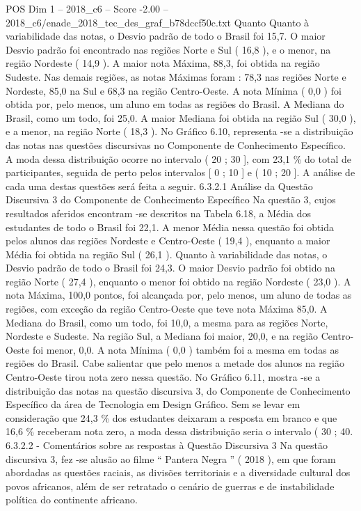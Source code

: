 \begin{textsample}{POS Dim 1 – 2018\_c6 – Score -2.00 – 2018\_c6/enade\_2018\_tec\_des\_graf\_b78dccf50c.txt}
Quanto Quanto à variabilidade das notas, o Desvio padrão de todo o Brasil foi 15,7.
O maior Desvio padrão foi encontrado nas regiões Norte e Sul ( 16,8 ), e o menor, na região Nordeste ( 14,9 ).
A maior nota Máxima, 88,3, foi obtida na região Sudeste.
Nas demais regiões, as notas Máximas foram : 78,3 nas regiões Norte e Nordeste, 85,0 na Sul e 68,3 na região Centro-Oeste.
A nota Mínima ( 0,0 ) foi obtida por, pelo menos, um aluno em todas as regiões do Brasil.
A Mediana do Brasil, como um todo, foi 25,0.
A maior Mediana foi obtida na região Sul ( 30,0 ), e a menor, na região Norte ( 18,3 ).
No Gráfico 6.10, representa -se a distribuição das notas nas questões discursivas no Componente de Conhecimento Específico.
A moda dessa distribuição ocorre no intervalo ( 20 ; 30 ], com 23,1 \% do total de participantes, seguida de perto pelos intervalos [ 0 ; 10 ] e ( 10 ; 20 ].
A análise de cada uma destas questões será feita a seguir. 6.3.2.1 Análise da Questão Discursiva 3 do Componente de Conhecimento Específico Na questão 3, cujos resultados aferidos encontram -se descritos na Tabela 6.18, a Média dos estudantes de todo o Brasil foi 22,1.
A menor Média nessa questão foi obtida pelos alunos das regiões Nordeste e Centro-Oeste ( 19,4 ), enquanto a maior Média foi obtida na região Sul ( 26,1 ).
Quanto à variabilidade das notas, o Desvio padrão de todo o Brasil foi 24,3.
O maior Desvio padrão foi obtido na região Norte ( 27,4 ), enquanto o menor foi obtido na região Nordeste ( 23,0 ).
A nota Máxima, 100,0 pontos, foi alcançada por, pelo menos, um aluno de todas as regiões, com exceção da região Centro-Oeste que teve nota Máxima 85,0.
A Mediana do Brasil, como um todo, foi 10,0, a mesma para as regiões Norte, Nordeste e Sudeste.
Na região Sul, a Mediana foi maior, 20,0, e na região Centro-Oeste foi menor, 0,0.
A nota Mínima ( 0,0 ) também foi a mesma em todas as regiões do Brasil.
Cabe salientar que pelo menos a metade dos alunos na região Centro-Oeste tirou nota zero nessa questão.
No Gráfico 6.11, mostra -se a distribuição das notas na questão discursiva 3, do Componente de Conhecimento Específico da área de Tecnologia em Design Gráfico.
Sem se levar em consideração que 24,3 \% dos estudantes deixaram a resposta em branco e que 16,6 \% receberam nota zero, a moda dessa distribuição seria o intervalo ( 30 ; 40. 6.3.2.2 - Comentários sobre as respostas à Questão Discursiva 3 Na questão discursiva 3, fez -se alusão ao filme “ Pantera Negra ” ( 2018 ), em que foram abordadas as questões raciais, as divisões territoriais e a diversidade cultural dos povos africanos, além de ser retratado o cenário de guerras e de instabilidade política do continente africano.

\end{textsample}
